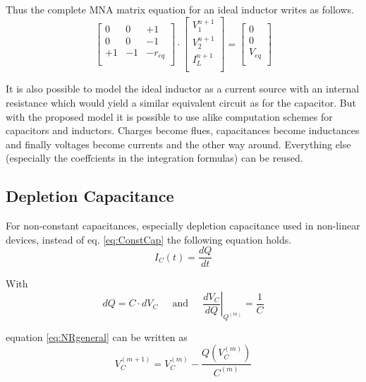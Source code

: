 Thus the complete MNA matrix equation for an ideal inductor writes
as follows.
\begin{equation}
\begin{bmatrix}
0 & 0 & +1\\
0 & 0 & -1\\
+1 & -1 & -r_{eq}\\
\end{bmatrix}
\cdot
\begin{bmatrix}
V_1^{n+1}\\
V_2^{n+1}\\
I_L^{n+1}\\
\end{bmatrix}
=
\begin{bmatrix}
0\\
0\\
V_{eq}\\
\end{bmatrix}
\end{equation}

It is also possible to model the ideal inductor as a current source with
an internal resistance which would yield a similar equivalent circuit
as for the capacitor.  But with the proposed model it is possible to
use alike computation schemes for capacitors and inductors.  Charges
become flues, capacitances become inductances and finally voltages
become currents and the other way around.  Everything else (especially
the coeffcients in the integration formulas) can be reused.

\subsection{Depletion Capacitance}

For non-constant capacitances, especially depletion capacitance used
in non-linear devices, instead of eq. \eqref{eq:ConstCap} the
following equation holds.
\begin{equation}
I_C(t) = \dfrac{d Q}{d t}
\end{equation}

With
\begin{equation}
d Q = C\cdot d V_C
\;\;\;\; \textrm{ and } \;\;\;\;
\left.\dfrac{d V_C}{d Q}\right|_{Q^{(m)}} = \dfrac{1}{C}
\end{equation}

equation \eqref{eq:NRgeneral} can be written as
\begin{equation}
V_C^{(m + 1)} = V_C^{(m)} - \dfrac{Q\left(V_C^{(m)}\right)}{C^{(m)}}
\end{equation}


